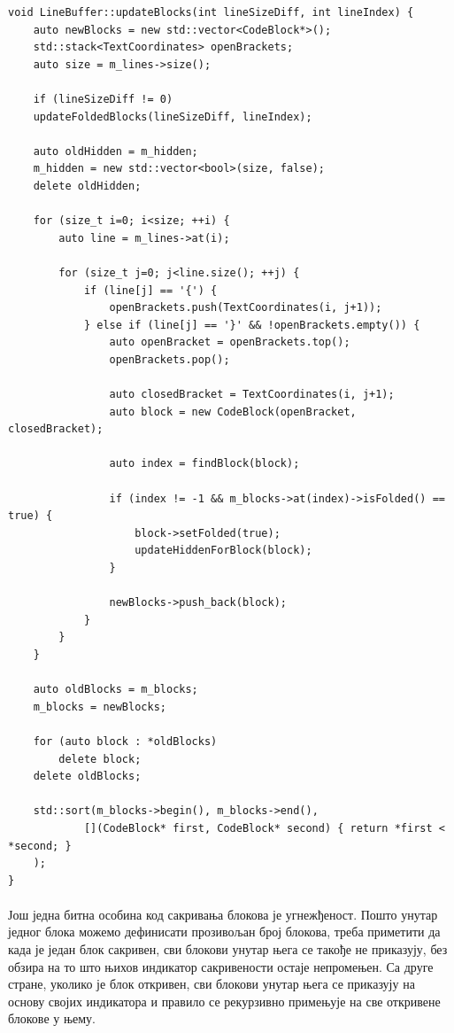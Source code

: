 \documentclass[12pt,oneside]{memoir}
\begin{document}
\begin{verbatim}
void LineBuffer::updateBlocks(int lineSizeDiff, int lineIndex) {
	auto newBlocks = new std::vector<CodeBlock*>();
	std::stack<TextCoordinates> openBrackets;
	auto size = m_lines->size();
	
	if (lineSizeDiff != 0)
	updateFoldedBlocks(lineSizeDiff, lineIndex);
	
	auto oldHidden = m_hidden;
	m_hidden = new std::vector<bool>(size, false);
	delete oldHidden;
	
	for (size_t i=0; i<size; ++i) {
		auto line = m_lines->at(i);
		
		for (size_t j=0; j<line.size(); ++j) {
			if (line[j] == '{') {
  				openBrackets.push(TextCoordinates(i, j+1));
  			} else if (line[j] == '}' && !openBrackets.empty()) {
  				auto openBracket = openBrackets.top();
  				openBrackets.pop();
  				
  				auto closedBracket = TextCoordinates(i, j+1);
  				auto block = new CodeBlock(openBracket, closedBracket);
  				
  				auto index = findBlock(block);
  				
  				if (index != -1 && m_blocks->at(index)->isFolded() == true) {
  					block->setFolded(true);
  					updateHiddenForBlock(block);
  				}
  				
  				newBlocks->push_back(block);
  			}
  		}
  	}
  	
  	auto oldBlocks = m_blocks;
  	m_blocks = newBlocks;
  	
  	for (auto block : *oldBlocks)
  		delete block;
  	delete oldBlocks;
  	
  	std::sort(m_blocks->begin(), m_blocks->end(), 
  			[](CodeBlock* first, CodeBlock* second) { return *first < *second; }
  	);
}

\end{verbatim}

\paragraph{}
Још једна битна особина код сакривања блокова је угнежђеност. Пошто унутар једног
блока можемо дефинисати прозивољан број блокова, треба приметити да када је
један блок сакривен, сви блокови унутар њега се такође не приказују, без обзира
на то што њихов индикатор сакривености остаје непромењен. Са друге стране, уколико
је блок откривен, сви блокови унутар њега се приказују на основу својих индикатора и правило се рекурзивно примењује на све откривене блокове у њему.  
\end{document}
